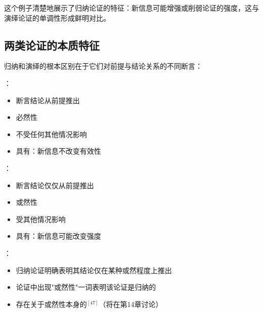 这个例子清楚地展示了归纳论证的特征：新信息可能增强或削弱论证的强度，这与演绎论证的单调性形成鲜明对比。

\subsection{两类论证的本质特征}

\begin{theorembox}[title=两类论证的本质特征对比]
归纳和演绎的根本区别在于它们对前提与结论关系的不同断言：

：
\begin{itemize}
  \item 断言结论从前提推出
  \item 必然性
  \item 不受任何其他情况影响
  \item 具有：新信息不改变有效性
\end{itemize}

：
\begin{itemize}
  \item 断言结论仅仅从前提推出
  \item 或然性
  \item 受其他情况影响
  \item 具有：新信息可能改变强度
\end{itemize}
\end{theorembox}

：
\begin{itemize}
  \item 归纳论证明确表明其结论仅在某种或然程度上推出
  \item 论证中出现"或然性"一词表明该论证是归纳的
  \item 存在关于或然性本身的$^{[47]}$（将在第14章讨论）
\end{itemize}

